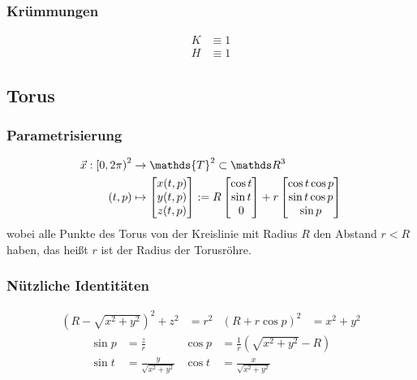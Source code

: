      \subsubsection{Krümmungen}
      \begin{align}
        K &\equiv 1 \\
        H &\equiv 1
      \end{align}

  \subsection{Torus}
  \label{torus}

    \subsubsection{Parametrisierung}
      \begin{align}
      \begin{aligned}
        \vec{x}: \left[ 0, 2\pi \right)^{2}
                    &\rightarrow \mathds{T}^{2} \subset \R^{3} \\
             \left( t,p \right) 
                    &\mapsto\begin{bmatrix}
                              x(t,p) \\ y(t,p) \\ z(t,p)
                            \end{bmatrix}
                    :=R \begin{bmatrix}
                          \cos t \\
                          \sin t \\
                            0
                        \end{bmatrix}
                      +r\begin{bmatrix}
                        \cos t \cos p \\
                        \sin t \cos p \\
                        \sin p
                      \end{bmatrix}
      \end{aligned}
      \end{align}
      wobei alle Punkte des Torus von der Kreislinie mit Radius \( R \) den Abstand \( r < R \) haben,
      das heißt \( r \) ist der Radius der Torusröhre.


    \subsubsection{Nützliche Identitäten}
      \begin{align}
        \left( R - \sqrt{x^{2}+y^{2}} \right)^{2} + z^{2} &= r^{2} 
        & \left( R + r\cos p \right)^{2} &= x^{2} + y^{2}
      \end{align}
      \begin{align}
        \sin p &= \frac{z}{r} &                  \cos p &= \frac{1}{r}\left( \sqrt{x^{2}+y^{2}} - R \right)\\
        \sin t &= \frac{y}{\sqrt{x^{2}+y^{2}}} & \cos t &= \frac{x}{\sqrt{x^{2}+y^{2}}}
      \end{align}

